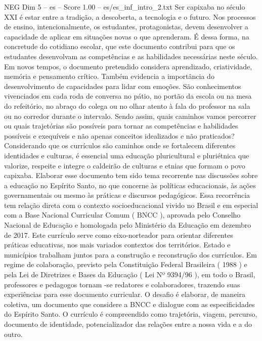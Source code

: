 \begin{textsample}{NEG Dim 5 – es – Score 1.00 – es/es\_inf\_intro\_2.txt}  \label{ex:f5_neg_190}
Ser capixaba no século XXI é estar entre a tradição, a descoberta, a tecnologia e o futuro.
Nos processos de ensino, intencionalmente, os estudantes, protagonistas, devem desenvolver a capacidade de aplicar em situações novas o que aprenderam.
É dessa forma, na concretude do cotidiano escolar, que este documento contribui para que os estudantes desenvolvam as competências e as habilidades necessárias neste século.
Em novos tempos, o documento pretendido considera aprendizado, criatividade, memória e pensamento crítico.
Também evidencia a importância do desenvolvimento de capacidades para lidar com emoções.
São conhecimentos vivenciados em cada roda de conversa no pátio, no portão da escola ou na mesa do refeitório, no abraço do colega ou no olhar atento à fala do professor na sala ou no corredor durante o intervalo.
Sendo assim, quais caminhos vamos percorrer ou quais trajetórias são possíveis para tornar as competências e habilidades possíveis e exequíveis e não apenas conceitos idealizados e não praticados?
Considerando que os currículos são caminhos onde se fortalecem diferentes identidades e culturas, é essencial uma educação pluricultural e pluriétnica que valorize, respeite e integre o caldeirão de culturas e etnias que formam o povo capixaba.
Elaborar esse documento tem sido tema recorrente nas discussões sobre a educação no Espírito Santo, no que concerne às políticas educacionais, às ações governamentais ou mesmo às práticas e discursos pedagógicos.
Essa recorrência tem relação direta com o contexto socioeducacional vivido no Brasil e em especial com a Base Nacional Curricular Comum ( BNCC ), aprovada pelo Conselho Nacional de Educação e homologada pelo Ministério da Educação em dezembro de 2017.
Este currículo serve como eixo-norteador para orientar diferentes práticas educativas, nos mais variados contextos dos territórios.
Estado e municípios trabalham juntos para a construção e reconstrução dos currículos.
Em regime de colaboração, previsto pela Constituição Federal Brasileira ( 1988 ) e pela Lei de Diretrizes e Bases da Educação ( Lei Nº 9394/96 ), em todo o Brasil, professores e pedagogos tornam -se redatores e colaboradores, trazendo suas experiências para esse documento curricular.
O desafio é elaborar, de maneira coletiva, um documento que considere a BNCC e dialogue com as especificidades do Espírito Santo.
O currículo é compreendido como trajetória, viagem, percurso, documento de identidade, potencializador das relações entre a nossa vida e a do outro.

\end{textsample}
